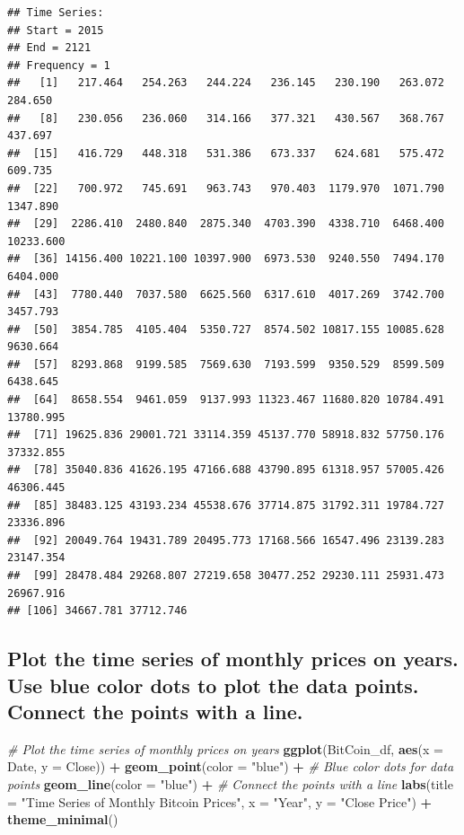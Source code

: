 \documentclass[
]{book}
\newenvironment{Shaded}{\begin{snugshade}}{\end{snugshade}}
\newcommand{\AttributeTok}[1]{\textcolor[rgb]{0.13,0.29,0.53}{#1}}
\newcommand{\CommentTok}[1]{\textcolor[rgb]{0.56,0.35,0.01}{\textit{#1}}}
\newcommand{\FunctionTok}[1]{\textcolor[rgb]{0.13,0.29,0.53}{\textbf{#1}}}
\newcommand{\NormalTok}[1]{#1}
\newcommand{\SpecialCharTok}[1]{\textcolor[rgb]{0.81,0.36,0.00}{\textbf{#1}}}
\newcommand{\StringTok}[1]{\textcolor[rgb]{0.31,0.60,0.02}{#1}}
\begin{document}
\begin{verbatim}
## Time Series:
## Start = 2015 
## End = 2121 
## Frequency = 1 
##   [1]   217.464   254.263   244.224   236.145   230.190   263.072   284.650
##   [8]   230.056   236.060   314.166   377.321   430.567   368.767   437.697
##  [15]   416.729   448.318   531.386   673.337   624.681   575.472   609.735
##  [22]   700.972   745.691   963.743   970.403  1179.970  1071.790  1347.890
##  [29]  2286.410  2480.840  2875.340  4703.390  4338.710  6468.400 10233.600
##  [36] 14156.400 10221.100 10397.900  6973.530  9240.550  7494.170  6404.000
##  [43]  7780.440  7037.580  6625.560  6317.610  4017.269  3742.700  3457.793
##  [50]  3854.785  4105.404  5350.727  8574.502 10817.155 10085.628  9630.664
##  [57]  8293.868  9199.585  7569.630  7193.599  9350.529  8599.509  6438.645
##  [64]  8658.554  9461.059  9137.993 11323.467 11680.820 10784.491 13780.995
##  [71] 19625.836 29001.721 33114.359 45137.770 58918.832 57750.176 37332.855
##  [78] 35040.836 41626.195 47166.688 43790.895 61318.957 57005.426 46306.445
##  [85] 38483.125 43193.234 45538.676 37714.875 31792.311 19784.727 23336.896
##  [92] 20049.764 19431.789 20495.773 17168.566 16547.496 23139.283 23147.354
##  [99] 28478.484 29268.807 27219.658 30477.252 29230.111 25931.473 26967.916
## [106] 34667.781 37712.746
\end{verbatim}

\subsection*{Plot the time series of monthly prices on years. Use blue color dots to plot the data points. Connect the points with a line.}\label{plot-the-time-series-of-monthly-prices-on-years.-use-blue-color-dots-to-plot-the-data-points.-connect-the-points-with-a-line.}

\begin{Shaded}
\begin{Highlighting}[]
\CommentTok{\# Plot the time series of monthly prices on years}
\FunctionTok{ggplot}\NormalTok{(BitCoin\_df, }\FunctionTok{aes}\NormalTok{(}\AttributeTok{x =}\NormalTok{ Date, }\AttributeTok{y =}\NormalTok{ Close)) }\SpecialCharTok{+}
  \FunctionTok{geom\_point}\NormalTok{(}\AttributeTok{color =} \StringTok{"blue"}\NormalTok{) }\SpecialCharTok{+} \CommentTok{\# Blue color dots for data points}
  \FunctionTok{geom\_line}\NormalTok{(}\AttributeTok{color =} \StringTok{"blue"}\NormalTok{) }\SpecialCharTok{+}  \CommentTok{\# Connect the points with a line}
  \FunctionTok{labs}\NormalTok{(}\AttributeTok{title =} \StringTok{"Time Series of Monthly Bitcoin Prices"}\NormalTok{,}
       \AttributeTok{x =} \StringTok{"Year"}\NormalTok{,}
       \AttributeTok{y =} \StringTok{"Close Price"}\NormalTok{) }\SpecialCharTok{+}
  \FunctionTok{theme\_minimal}\NormalTok{()}
\end{Highlighting}
\end{Shaded}
\end{document}
